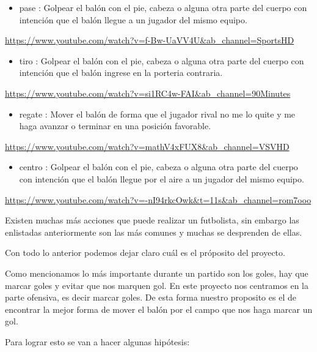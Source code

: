 \documentclass[
  us-letterpaper,
  DIV=11,
  numbers=noendperiod]{scrreprt}
\providecommand{\tightlist}{%
  \setlength{\itemsep}{0pt}\setlength{\parskip}{0pt}}\usepackage{longtable,booktabs,array}
\begin{document}
\begin{itemize}
\tightlist
\item
  pase : Golpear el balón con el pie, cabeza o alguna otra parte del
  cuerpo con intención que el balón llegue a un jugador del mismo
  equipo.
\end{itemize}

\url{https://www.youtube.com/watch?v=f-Bw-UaVV4U&ab_channel=SportsHD}

\begin{itemize}
\tightlist
\item
  tiro : Golpear el balón con el pie, cabeza o alguna otra parte del
  cuerpo con intención que el balón ingrese en la porteria contraria.
\end{itemize}

\url{https://www.youtube.com/watch?v=si1RC4w-FAI&ab_channel=90Minutes}

\begin{itemize}
\tightlist
\item
  regate : Mover el balón de forma que el jugador rival no me lo quite y
  me haga avanzar o terminar en una posición favorable.
\end{itemize}

\url{https://www.youtube.com/watch?v=mathV4xFUX8&ab_channel=VSVHD}

\begin{itemize}
\tightlist
\item
  centro : Golpear el balón con el pie, cabeza o alguna otra parte del
  cuerpo con intención que el balón llegue por el aire a un jugador del
  mismo equipo.
\end{itemize}

\url{https://www.youtube.com/watch?v=-nI94rkcOwk&t=11s&ab_channel=rom7ooo}

Existen muchas más acciones que puede realizar un futbolista, sin
embargo las enlistadas anteriormente son las más comunes y muchas se
desprenden de ellas.

Con todo lo anterior podemos dejar claro cuál es el próposito del
proyecto.

Como mencionamos lo más importante durante un partido son los goles, hay
que marcar goles y evitar que nos marquen gol. En este proyecto nos
centramos en la parte ofensiva, es decir marcar goles. De esta forma
nuestro proposito es el de encontrar la mejor forma de mover el balón
por el campo que nos haga marcar un gol.

Para lograr esto se van a hacer algunas hipótesis:
\end{document}
